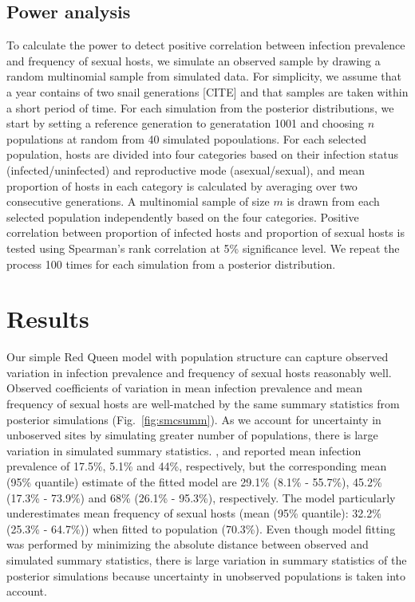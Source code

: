 \documentclass{article}\usepackage[]{graphicx}\usepackage[]{color}
\newcommand{\fref}[1]{Fig.~\ref{fig:#1}}
\begin{document}
\subsection{Power analysis}


To calculate the power to detect positive correlation between infection prevalence and frequency of sexual hosts, we simulate an observed sample by drawing a random multinomial sample from simulated data.
For simplicity, we assume that a year contains of two snail generations [CITE] and that samples are taken within a short period of time.
For each simulation from the posterior distributions, we start by setting a reference generation to generatation 1001 and choosing $n$ populations at random from 40 simulated popoulations.
For each selected population, hosts are divided into four categories based on their infection status (infected/uninfected) and reproductive mode (asexual/sexual),
and mean proportion of hosts in each category is calculated by averaging over two consecutive generations.
A multinomial sample of size $m$ is drawn from each selected population independently based on the four categories. 
Positive correlation between proportion of infected hosts and proportion of sexual hosts is tested using Spearman's rank correlation at 5\% significance level.
We repeat the process 100 times for each simulation from a posterior distribution.

\section{Results}

Our simple Red Queen model with population structure can capture observed variation in infection prevalence and frequency of sexual hosts reasonably well.
Observed coefficients of variation in mean infection prevalence and mean frequency of sexual hosts are well-matched by the same summary statistics from posterior simulations (\fref{smcsumm}).
As we account for uncertainty in unboserved sites by simulating greater number of populations, there is large variation in simulated summary statistics.
\cite{dagan2013clonal}, \cite{mckone2016fine} and \cite{vergara2014infection} reported mean infection prevalence of 17.5\%, 5.1\% and 44\%, respectively, but the corresponding mean (95\% quantile) estimate of the fitted model are 29.1\% (8.1\% - 55.7\%), 45.2\% (17.3\% - 73.9\%) and 68\% (26.1\% - 95.3\%), respectively.
The model particularly underestimates mean frequency of sexual hosts (mean (95\% quantile): 32.2\% (25.3\% - 64.7\%)) when fitted to \cite{vergara2014infection} population (70.3\%).
Even though model fitting was performed by minimizing the absolute distance between observed and simulated summary statistics, there is large variation in summary statistics of the posterior simulations because uncertainty in unobserved populations is taken into account.
\end{document}

